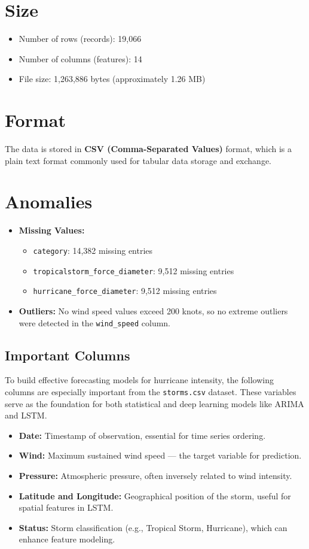 \newpage
\section{Size}
\begin{itemize}
	\item Number of rows (records): 19,066
	\item Number of columns (features): 14
	\item File size: 1,263,886 bytes (approximately 1.26 MB)
\end{itemize}

\section{Format}
The data is stored in \textbf{CSV (Comma-Separated Values)} format, which is a plain text format commonly used for tabular data storage and exchange.

\section{Anomalies}
\begin{itemize}
	\item \textbf{Missing Values:}
	\begin{itemize}
		\item \texttt{category}: 14,382 missing entries
		\item \texttt{tropicalstorm\_force\_diameter}: 9,512 missing entries
		\item \texttt{hurricane\_force\_diameter}: 9,512 missing entries
	\end{itemize}
	\item \textbf{Outliers:} No wind speed values exceed 200 knots, so no extreme outliers were detected in the \texttt{wind\_speed} column.
\end{itemize}

\subsection{Important Columns}

To build effective forecasting models for hurricane intensity, the following columns are especially important from the \texttt{storms.csv} dataset. These variables serve as the foundation for both statistical and deep learning models like ARIMA and LSTM.

\begin{itemize}
	\item \textbf{Date:} Timestamp of observation, essential for time series ordering.
	\item \textbf{Wind:} Maximum sustained wind speed — the target variable for prediction.
	\item \textbf{Pressure:} Atmospheric pressure, often inversely related to wind intensity.
	\item \textbf{Latitude and Longitude:} Geographical position of the storm, useful for spatial features in LSTM.
	\item \textbf{Status:} Storm classification (e.g., Tropical Storm, Hurricane), which can enhance feature modeling.
\end{itemize}

